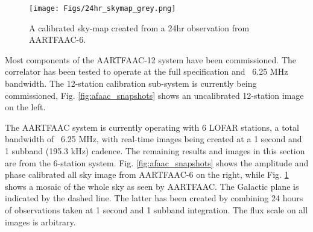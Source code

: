 \documentclass{ws-jai}
\begin{document}

\begin{figure}
  \texttt{[image: Figs/24hr\_skymap\_grey.png]}
  \caption{A calibrated sky-map created from a 24hr observation from AARTFAAC-6.}
  \label{fig:afaac_24hr}
  
\end{figure}

Most components of the AARTFAAC-12 system have been commissioned. The correlator
has been tested  to operate at the  full specification and ~6.25
MHz  bandwidth.  The  12-station   calibration  sub-system  is  currently  being
commissioned,  Fig. \ref{fig:afaac_snapshots}  shows an  uncalibrated 12-station
image on the left.

The  AARTFAAC system  is  currently operating  with 6  LOFAR  stations, a  total
bandwidth of ~6.25 MHz, with real-time images  being created at a 1 second and 1
subband (195.3  kHz) cadence. The remaining  results and images in  this section
are  from  the  6-station  system.  Fig.   \ref{fig:afaac_snapshots}  shows  the
amplitude and phase calibrated all sky image from AARTFAAC-6 on the right, while
Fig.   \ref{fig:afaac_24hr}  shows  a  mosaic  of  the  whole  sky  as  seen  by
AARTFAAC. The  Galactic plane is  indicated by the  dashed line. The  latter has
been created  by combining  24 hours  of observations  taken at  1 second  and 1
subband integration.  The flux scale on all images is arbitrary. \\
\end{document}
